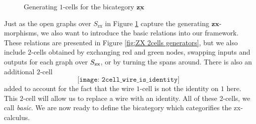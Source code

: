 \documentclass[11pt]{amsart}
\theoremstyle{definition}
\begin{document}
\begin{figure}[h]
	\caption{Generating $1$-cells for the bicategory $\underline{\mathbf{zx}}$}
	\label{fig:ZX 1cells generators}
\end{figure} 

Just as the open graphs over $S_{\text{zx}}$ in Figure \ref{fig:ZX 1cells generators} capture the generating $\mathbf{zx}$-morphisms, we also want to introduce the basic relations into our framework.  These relations are presented in Figure \ref{fig:ZX 2cells generators}, but we also include $2$-cells obtained by exchanging red and green nodes, swapping inputs and outputs for each graph over $S_{\textup{zx}}$, or by turning the spans around.  There is also an additional $2$-cell
\[
\texttt{[image: 2cell\_wire\_is\_identity]}
\]
added to account for the fact that the wire $1$-cell is not the identity on $1$ here. This $2$-cell will allow us to replace a wire with an identity. All of these $2$-cells, we call \emph{basic}.  We are now ready to define the bicategory which categorifies the zx-calculus.
\end{document}
